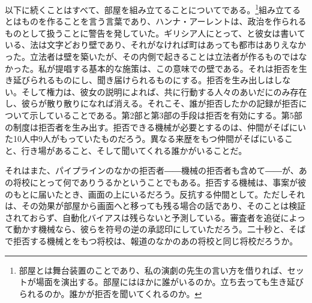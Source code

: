 以下に続くことはすべて、部屋を組み立てることについてである。\footnote{部屋とは舞台装置のことであり、私の演劇の先生の言い方を借りれば、セットが場面を演出する。部屋にはほかに誰がいるのか。立ち去っても生き延びられるのか。誰かが拒否を聞いてくれるのか。}組み立てるとはものを作ることを言う言葉であり、ハンナ・アーレントは、政治を作られるものとして扱うことに警告を発していた。ギリシア人にとって、と彼女は書いている、法は文字どおり壁であり、それがなければ町はあっても都市はありえなかった\autocite{arendt1958human}。立法者は壁を築いたが、その内側で起きることは立法者が作るものではなかった。私が提唱する基本的な施策は、この意味での壁である。それは拒否を生き延びられるものにし、聞き届けられるものにする。拒否を生み出しはしない。そして権力は、彼女の説明によれば、共に行動する人々のあいだにのみ存在し、彼らが散り散りになれば消える。それこそ、誰が拒否したかの記録が拒否について示していることである。第2部と第3部の手段は拒否を有効にする。第5部の制度は拒否者を生み出す。拒否できる機械が必要とするのは、仲間がそばにいた10人中9人がもっていたものだろう。異なる来歴をもつ仲間がそばにいること、行き場があること、そして聞いてくれる誰かがいることだ。

それはまた、パイプラインのなかの拒否者――機械の拒否者も含めて――が、あの将校にとって何でありうるかということでもある。拒否する機械は、事案が彼のもとに届いたとき、画面の上にいるだろう。反抗する仲間として。ただしそれは、その効果が部屋から画面へと移っても残る場合の話であり、そのことは検証されておらず、自動化バイアスは残らないと予測している。審査者を追従によって動かす機械なら、彼らを符号の逆の承認印にしていただろう。二十秒と、そばで拒否する機械とをもつ将校は、報道のなかのあの将校と同じ将校だろうか。
